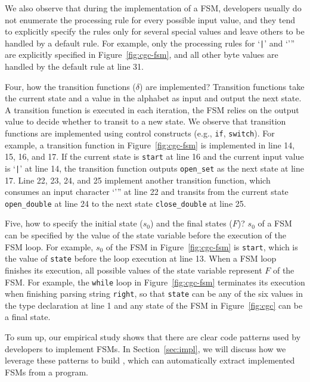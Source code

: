 We also observe that during the implementation of a FSM, 
developers usually do not enumerate the processing rule for every possible
input value, 
and they tend to explicitly specify the rules only for several special values
and leave others to be handled by a default rule. 
For example, only the processing rules for `\verb/|/' and `''' 
are explicitly specified in Figure~\ref{fig:cgc-fsm}, 
and all other byte values are handled by 
the default rule at line 31. 

Four, how the transition functions ($\delta$) are implemented?
Transition functions take the current state and a value
in the alphabet as input and output the next state. 
A transition function is executed in each iteration, 
the FSM relies on the output value to decide whether to transit to a new state. 
We observe that transition functions are implemented
using control constructs (e.g., \texttt{if}, \texttt{switch}). 
For example, a transition function in Figure~\ref{fig:cgc-fsm} 
is implemented in line 14, 15, 16, and 17. 
If the current state is \texttt{start} 
at line 16 and the current input value is 
`\verb/|/' at line 14, the transition function outputs \texttt{open\_set}
as the next state at line 17. 
Line 22, 23, 24, and 25 implement another transition function,
which consumes an input character `''' at line 22 and 
transits from the current state 
\texttt{open\_double} at line 24 to 
the next state \texttt{close\_double} at line 25. 

Five, how to specify the initial state ($s_0$) and the final states ($F$)? 
$s_0$ of a FSM can be specified 
by the value of the state variable before the execution of the FSM loop.
For example,  $s_0$ of the FSM in Figure~\ref{fig:cgc-fsm}
is \texttt{start}, which is the value of \texttt{state} 
before the loop execution at line 13. 
When a FSM loop finishes its execution, 
all possible values of the state variable
represent $F$ of the FSM. 
For example, the \texttt{while} loop in Figure~\ref{fig:cgc-fsm} terminates 
its execution when finishing parsing string \texttt{right}, 
so that \texttt{state} can be any of the six values 
in the type declaration at line 1 
and any state of the FSM in 
Figure~\ref{fig:cgc} can be a final state. 


To sum up, our empirical study shows that 
there are clear code patterns used by developers to implement FSMs. 
In Section~\ref{sec:impl}, we will discuss how we 
leverage these patterns to build \Tool{}, 
which can automatically extract implemented FSMs from a program. 





